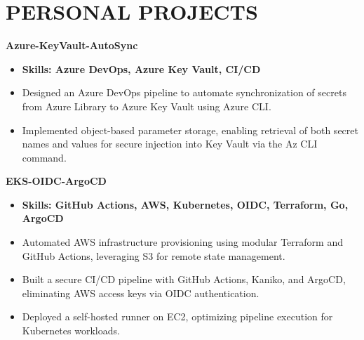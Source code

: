 \documentclass[11pt,a4paper]{article}
\newenvironment{dashlist}{
  \begin{itemize}[label={--}]
}{
  \end{itemize}
}
\begin{document}
\section*{PERSONAL PROJECTS}
\noindent\textbf{Azure-KeyVault-AutoSync}
\begin{itemize}
\item \textbf{Skills: Azure DevOps, Azure Key Vault, CI/CD}
\end{itemize}
\begin{dashlist}
    \item Designed an Azure DevOps pipeline to automate synchronization of secrets from Azure Library to Azure Key Vault using Azure CLI.
    \item Implemented object-based parameter storage, enabling retrieval of both secret names and values for secure injection into Key Vault via the Az CLI command.
\end{dashlist}
\vspace{0.5em}

\noindent\textbf{EKS-OIDC-ArgoCD}
\begin{itemize}
\item \textbf{Skills: GitHub Actions, AWS, Kubernetes, OIDC, Terraform, Go, ArgoCD}
\end{itemize}
\begin{dashlist}
    \item Automated AWS infrastructure provisioning using modular Terraform and GitHub Actions, leveraging S3 for remote state management.
    \item Built a secure CI/CD pipeline with GitHub Actions, Kaniko, and ArgoCD, eliminating AWS access keys via OIDC authentication.
    \item Deployed a self-hosted runner on EC2, optimizing pipeline execution for Kubernetes workloads.
\end{dashlist}
\vspace{0.5em}
\end{document}
